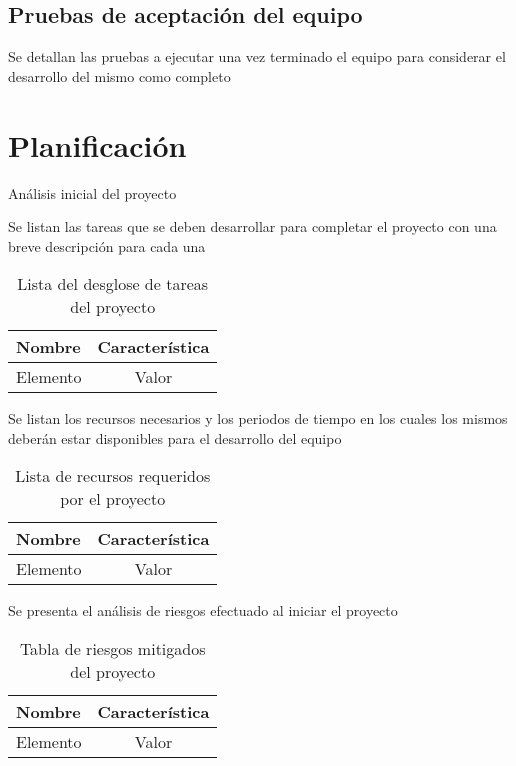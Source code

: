 \subsection{Pruebas de aceptación del equipo}

Se detallan las pruebas a ejecutar una vez terminado el equipo para considerar el desarrollo del mismo como completo

\section{Planificación}

Análisis inicial del proyecto

Se listan las tareas que se deben desarrollar para completar el proyecto con una breve descripción para cada una

\begin{table}[ht]
	\centering
	\caption{Lista del desglose de tareas del proyecto}
	\begin{tabular}{l c}    
		\toprule
		\textbf{Nombre} 	& \textbf{Característica}	\\
		\midrule
		Elemento 			& Valor	\\
		\bottomrule
		\hline
	\end{tabular}
	\label{tab:ListaTareas}
\end{table}

Se listan los recursos necesarios y los periodos de tiempo en los cuales los mismos deberán estar disponibles para el desarrollo del equipo

\begin{table}[ht]
	\centering
	\caption{Lista de recursos requeridos por el proyecto}
	\begin{tabular}{l c}    
		\toprule
		\textbf{Nombre} 	& \textbf{Característica}	\\
		\midrule
		Elemento 			& Valor	\\
		\bottomrule
		\hline
	\end{tabular}
	\label{tab:ListaRecursos}
\end{table}

Se presenta el análisis de riesgos efectuado al iniciar el proyecto

\begin{table}[ht]
	\centering
	\caption{Tabla de riesgos mitigados del proyecto}
	\begin{tabular}{l c}    
		\toprule
		\textbf{Nombre} 	& \textbf{Característica}	\\
		\midrule
		Elemento 			& Valor	\\
		\bottomrule
		\hline
	\end{tabular}
	\label{tab:ListaRiesgos}
\end{table}

